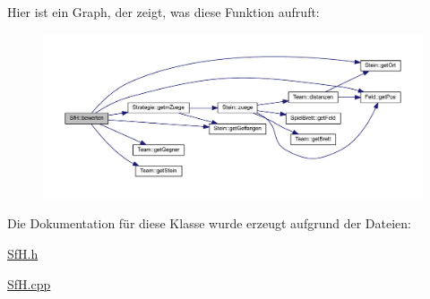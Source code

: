 Hier ist ein Graph, der zeigt, was diese Funktion aufruft\+:\nopagebreak
\begin{figure}[H]
\begin{center}
\leavevmode
\includegraphics[width=350pt]{class_sf_h_a9790a3fab6619e16961568d735678d4f_cgraph}
\end{center}
\end{figure}




Die Dokumentation für diese Klasse wurde erzeugt aufgrund der Dateien\+:\begin{DoxyCompactItemize}
\item 
\hyperlink{_sf_h_8h}{Sf\+H.\+h}\item 
\hyperlink{_sf_h_8cpp}{Sf\+H.\+cpp}\end{DoxyCompactItemize}
